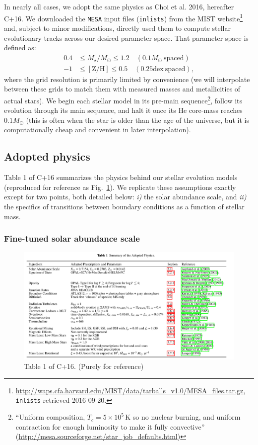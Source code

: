 \documentclass{article}
\begin{document}
In nearly all cases, we adopt the same physics as Choi et al. 2016, hereafter 
C+16.
We downloaded the \texttt{MESA} input files (\texttt{inlists}) from the MIST 
website\footnote{\url{http://waps.cfa.harvard.edu/MIST/data/tarballs_v1.0/MESA_files.tar.gz},
\texttt{inlists} retrieved 2016-09-20.} and, subject to minor modifications, 
directly used them to compute stellar evolutionary tracks 
across our desired parameter space.
That parameter space is defined as:
\begin{align}
0.4 &\leq M_\star / M_\odot \leq 1.2\quad (0.1M_\odot\ \mathrm{spaced}) \\
-1 &\leq \mathrm{[Z/H]} \leq 0.5\quad (0.25\mathrm{dex\ spaced}),
\end{align}
where the grid resolution is primarily limited by convenience (we will 
interpolate between these grids to match them with measured masses and 
metallicities of actual stars).
We begin each stellar model in its pre-main sequence\footnote{``Uniform 
composition, $T_c=5\times10^5\,\mathrm{K}$ so no nuclear burning, and uniform 
contraction for enough luminosity to make it fully convective'' 
(\url{http://mesa.sourceforge.net/star_job_defaults.html})}, follow its 
evolution
through its main sequence, and halt it once its He core-mass reaches 
$0.1M_\odot$ (this is often when the star is older than the age of the 
universe, but it is computationally cheap and convenient in later 
interpolation).


\subsection{Adopted physics}
Table 1 of C+16 summarizes the physics behind our stellar evolution models 
(reproduced for reference as Fig.~\ref{fig:table1_C16}).
We replicate these assumptions exactly except for two points, both detailed 
below: \textit{i)} the solar abundance scale, and \textit{ii)} the specifics of 
transitions between boundary conditions as a function of stellar mass.


\subsubsection{Fine-tuned solar abundance scale}
\begin{figure}[t]
	\centering
	\includegraphics[width=\textwidth]{figs/Choi2016_MIST_table_1.png}
	\caption{Table 1 of C+16. (Purely for reference)}
	\label{fig:table1_C16}
\end{figure}
\end{document}
